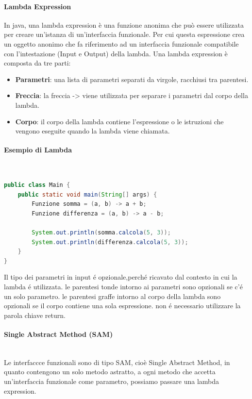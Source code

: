 \documentclass[11pt]{article}
\begin{document}
\paragraph{Lambda Expression}
In java, una lambda expression è una funzione anonima che può essere utilizzata per creare un'istanza di un'interfaccia funzionale.
Per cui questa espressione crea un oggetto anonimo che fa riferimento ad un interfaccia funzionale compatibile con l'intestazione (Input e Output) della lambda.
Una lambda expression è composta da tre parti:
\begin{itemize}
    \item \textbf{Parametri}: una lista di parametri separati da virgole, racchiusi tra parentesi.
    \item \textbf{Freccia}: la freccia -> viene utilizzata per separare i parametri dal corpo della lambda.
    \item \textbf{Corpo}: il corpo della lambda contiene l'espressione o le istruzioni che vengono eseguite quando la lambda viene chiamata.
    \end{itemize}
\paragraph{Esempio di Lambda}
\\
\begin{lstlisting}[language=Java]
public class Main {
    public static void main(String[] args) {
        Funzione somma = (a, b) -> a + b;
        Funzione differenza = (a, b) -> a - b;

        System.out.println(somma.calcola(5, 3));
        System.out.println(differenza.calcola(5, 3));
    }
}
\end{lstlisting}
Il tipo dei parametri in input é opzionale,perché ricavato dal contesto in cui la lambda é utilizzata.
le parentesi tonde intorno ai parametri sono opzionali se c'é un solo parametro.
le parentesi graffe intorno al corpo della lambda sono opzionali se il corpo contiene una sola espressione.
non é necessario utilizzare la parola chiave return.
\paragraph{Single Abstract Method (SAM)}
\\
Le interfaccce funzionali sono di tipo SAM, cioè Single Abstract Method, in quanto contengono un solo metodo astratto,
a ogni metodo che accetta un'interfaccia funzionale come parametro, possiamo passare una lambda expression.
\end{document}
